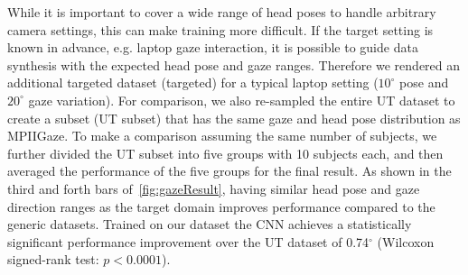 While it is important to cover a wide range of head poses to handle arbitrary camera settings, this can make training more difficult.
If the target setting is known in advance, e.g. laptop gaze interaction, it is possible to guide data synthesis with the expected head pose and gaze ranges.
Therefore we rendered an additional targeted dataset (\dataset targeted) for a typical laptop setting ($10^{\circ}$ pose and $20^{\circ}$ gaze variation).
For comparison, we also re-sampled the entire UT dataset to create a subset (UT subset) that has the same gaze and head pose distribution as MPIIGaze.
To make a comparison assuming the same number of subjects, we further divided the UT subset into five groups with 10 subjects each,
and then averaged the performance of the five groups for the final result. 
As shown in the third and forth bars of~\autoref{fig:gazeResult}, having similar head pose and gaze direction ranges as the target domain improves performance compared to the generic datasets.
Trained on our \dataset dataset the CNN achieves a statistically significant performance improvement over the UT dataset of 0.74$^{\circ}$ (Wilcoxon signed-rank test: $p\!<\!0.0001$).

